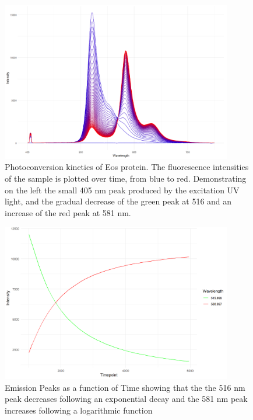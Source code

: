 \documentclass[a4paper,english,12pt,bibliography=totoc]{scrreprt}
\begin{document}
\begin{figure}[h]
    \centering
    \includegraphics[width=0.9\textwidth]{Figures/conversion.png} 
    \caption{Photoconversion kinetics of Eos protein. The fluorescence intensities of the sample is plotted over time, from blue to red. Demonstrating on the left the small 405 nm peak produced by the excitation UV light, and the gradual decrease of the green peak at 516 and an increase of the red peak at 581 nm.}
    \label{fig:photoconversion}
\end{figure}

\begin{figure}[h]
    \centering
    \includegraphics[width=0.9\textwidth]{Figures/Wavelengths intensity.png} 
    \caption{Emission Peaks as a function of Time showing that the the 516 nm peak decreases following an exponential decay and the 581 nm peak increases following a logarithmic function}
    \label{fig:photoconversion}
\end{figure}
\end{document}

